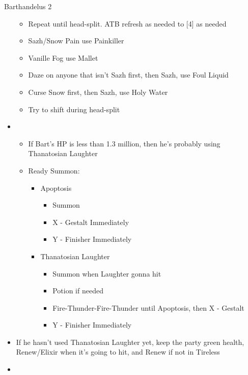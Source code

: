 \begin{battle}[2:30 $|$ 2:15]{Barthandelus 2}
\begin{multicols}{2}
\begin{itemize}
\begin{itemize}
				      \item Repeat until head-split. ATB refresh as needed to [4] as needed
				      \item Sazh/Snow Pain use Painkiller
				      \item Vanille Fog use Mallet
				      \item Daze on anyone that isn't Sazh first, then Sazh, use Foul Liquid
				      \item Curse Snow first, then Sazh, use Holy Water
				      \item Try to shift during head-split
			      \end{itemize}
			\item \fifth
			      \begin{itemize}
				      \item If Bart's HP is less than 1.3 million, then he's probably using Thanatosian Laughter
				      \item Ready Summon:
				            \begin{itemize}
					            \item Apoptosis
					                  \begin{itemize}
						                  \item Summon
						                  \item X - Gestalt Immediately
						                  \item Y - Finisher Immediately
					                  \end{itemize}
					            \item Thanatosian Laughter
					                  \begin{itemize}
						                  \item Summon when Laughter gonna hit
						                  \item Potion if needed
						                  \item Fire-Thunder-Fire-Thunder until Apoptosis, then X - Gestalt
						                  \item Y - Finisher Immediately
					                  \end{itemize}
				            \end{itemize}
			      \end{itemize}
			      \columnbreak
			\item If he hasn't used Thanatosian Laughter yet, keep the party green health, Renew/Elixir when it's going to hit, and Renew if not in Tireless
			\item \fifth

\end{itemize}
\end{multicols}
\end{battle}
